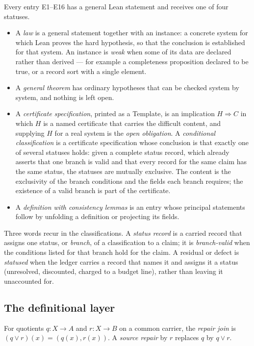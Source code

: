 Every entry E1--E16 has a general Lean statement and receives one of four statuses.
\begin{itemize}
  \item A \emph{law} is a general statement together with an instance: a concrete system for which
    Lean proves the hard hypothesis, so that the conclusion is established for that system. An
    instance is \emph{weak} when some of its data are declared rather than derived --- for example
    a completeness proposition declared to be true, or a record sort with a single element.
  \item A \emph{general theorem} has ordinary hypotheses that can be checked system by system, and
    nothing is left open.
  \item A \emph{certificate specification}, printed as a Template, is an implication $H \Rightarrow C$
    in which $H$ is a named certificate that carries the difficult content, and supplying $H$ for a
    real system is the \emph{open obligation}. A \emph{conditional classification} is a certificate
    specification whose conclusion is that exactly one of several statuses holds: given a complete
    status record, which already asserts that one branch is valid and that every record for the same
    claim has the same status, the statuses are mutually exclusive. The content is the exclusivity of
    the branch conditions and the fields each branch requires; the existence of a valid branch is
    part of the certificate.
  \item A \emph{definition with consistency lemmas} is an entry whose principal statements follow by
    unfolding a definition or projecting its fields.
\end{itemize}

Three words recur in the classifications. A \emph{status record} is a carried record that assigns
one status, or \emph{branch}, of a classification to a claim; it is \emph{branch-valid} when the
conditions listed for that branch hold for the claim. A residual or defect is \emph{statused} when
the ledger carries a record that names it and assigns it a status (unresolved, discounted, charged
to a budget line), rather than leaving it unaccounted for.

\subsection{The definitional layer}\label{sec:setting-defs}

\begin{definition}\label{def:d1}
For quotients $q : X \to A$ and $r : X \to B$ on a common carrier, the \emph{repair join} is
$(q \vee r)(x) = (q(x), r(x))$. A \emph{source repair} by $r$ replaces $q$ by $q \vee r$.
\end{definition}

